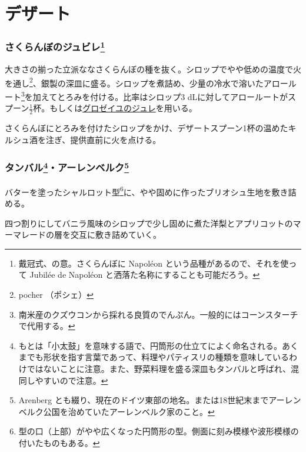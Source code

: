 \hypertarget{ux30c7ux30b6ux30fcux30c8}{%
\section{デザート}\label{ux30c7ux30b6ux30fcux30c8}}
\begin{recette}
\hypertarget{cerises-jubilee}{%
\subsubsection[さくらんぼのジュビレ]{\texorpdfstring{さくらんぼのジュビレ\footnote{戴冠式、の意。さくらんぼに
  Napoléon という品種があるので、それを使って Jubilée de Napoléon
  と洒落た名称にすることも可能だろう。}}{さくらんぼのジュビレ}}\label{cerises-jubilee}}


大きさの揃った立派ななさくらんぼの種を抜く。シロップでやや低めの温度で火を通し\footnote{pocher
  （ポシェ）}、銀製の深皿に盛る。シロップを煮詰め、少量の冷水で溶いたアロールート\footnote{南米産のクズウコンから採れる良質のでんぷん。一般的にはコーンスターチで代用する。}を加えてとろみを付ける。比率はシロップ3
dLに対してアロールートがスプーン\(\frac{1}{2}\)杯。もしくは\protect\hyperlink{gelee-de-groseilles-a}{グロゼイユのジュレ}を用いる。

さくらんぼにとろみを付けたシロップをかけ、デザートスプーン1杯の温めたキルシュ酒を注ぎ、提供直前に火を点ける。

\hypertarget{timbale-d-arenberg}{%
\subsubsection[タンバル・アーレンベルク]{\texorpdfstring{タンバル\footnote{もとは「小太鼓」を意味する語で、円筒形の仕立てによく命名される。あくまでも形状を指す言葉であって、料理やパティスリの種類を意味しているわけではないことに注意。また、野菜料理を盛る深皿もタンバルと呼ばれ、混同しやすいので注意。}・アーレンベルク\footnote{Arenberg
  とも綴り、現在のドイツ東部の地名。または18世紀末までアーレンベルク公国を治めていたアーレンベルク家のこと。}}{タンバル・アーレンベルク}}\label{timbale-d-arenberg}}


バターを塗ったシャルロット型\footnote{型の口（上部）がやや広くなった円筒形の型。側面に刻み模様や波形模様の付いたものもある。}に、やや固めに作ったブリオシュ生地を敷き詰める。

四つ割りにしてバニラ風味のシロップで少し固めに煮た洋梨とアプリコットのマーマレードの層を交互に敷き詰めていく。


\end{recette}
